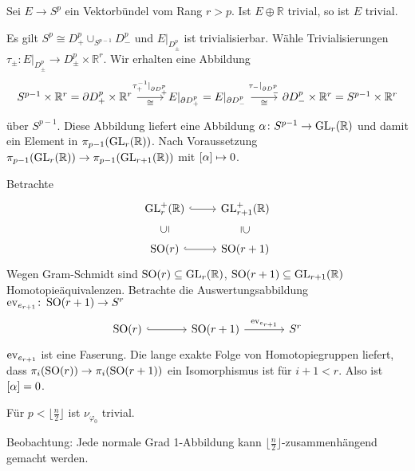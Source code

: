 \begin{proposition}
	Sei $E \to S^p$ ein Vektorbündel vom Rang $r > p$.
	Ist $E \oplus \mathbb{R}$ trivial, so ist $E$ trivial.
\end{proposition}
\begin{beweis}
	Es gilt $S^p \cong D^p_+ \cup_{S^{p-1}}  D^p_-$ und $E|_{D^p_\pm}$ ist trivialisierbar.
	Wähle Trivialisierungen $\tau_\pm \colon E|_{D_\pm^p} \to D^p_\pm \times \mathbb{R}^r$.
	Wir erhalten eine Abbildung 
	\[
		\begin{tikzcd}
			S^{p-1} \times \mathbb{R}^r = \partial D^p_+ \times \mathbb{R}^r  \rar["\tau_+^{-1}|_{\partial D^p_+}","\cong"'] & E|_{\partial D^p_+} = E|_{\partial D^p_-} \rar["\tau_-|_{\partial D^p_-}","\cong"'] & \partial D^p_- \times \mathbb{R}^r = S^{p-1} \times \mathbb{R}^r
		\end{tikzcd}
	\]
	über $S^{p-1}$.
	Diese Abbildung liefert eine Abbildung $\alpha \colon S^{p-1} \to \GL_r(\mathbb{R})$ und damit ein Element in $\pi_{p-1} \enbrace*{\GL_r(\mathbb{R})}$.
	Nach Voraussetzung $\pi_{p-1} \enbrace*{\GL_r(\mathbb{R})} \to \pi_{p-1} \enbrace*{\GL_{r+1}(\mathbb{R})}$ mit $\benbrace*{\alpha} \mapsto 0$.
	
	Betrachte 
	\[
		\begin{tikzcd}
			\GL^+_r(\mathbb{R}) \rar[hook] & \GL^+_{r+1}(\mathbb{R}) \dar[sloped,phantom,"\supseteq"] \\
			\SO(r) \rar[hook] \uar[sloped,phantom,"\subseteq"] & \SO(r+1)
		\end{tikzcd}
	\]
	Wegen Gram-Schmidt sind $\SO(r) \subseteq \GL_r(\mathbb{R})$, $\SO(r+1) \subseteq \GL_{r+1}(\mathbb{R})$ Homotopieäquivalenzen.
	Betrachte die Auswertungsabbildung $\ev_{e_{r+1}} \colon \SO(r+1) \to S^r$
	\[
		\begin{tikzcd}[sep=large]
			\SO(r) \rar[hook] &   \SO(r+1) \rar["\ev_{e_{r+1}}"] & S^r
		\end{tikzcd}
	\]
	$\ev_{e_{r+1}}$ ist eine Faserung.
	Die lange exakte Folge von Homotopiegruppen liefert, dass $\pi_i(\SO(r)) \to \pi_i(\SO(r+1))$ ein Isomorphismus ist für $i+1 < r$.
	Also ist $\benbrace*{\alpha}=0$.
\end{beweis}

\begin{korollar}
	Für $p < \lfloor \frac{n}{2} \rfloor$ ist $\nu_{\varphi_0}$ trivial.
\end{korollar}

Beobachtung: Jede normale Grad 1-Abbildung kann $\lfloor \frac{n}{2}\rfloor$-zusammenhängend gemacht werden.

